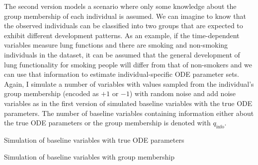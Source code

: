 The second version models a scenario where only some knowledge about the group membership of each individual is assumed. 
We can imagine to know that the observed individuals can be classified into two groups that are expected to exhibit different development patterns. As an example, if the time-dependent variables measure lung functions and there are smoking and non-smoking individuals in the dataset, it can be assumed that the general development of lung functionality for smoking people will differ from that of non-smokers and we can use that information to estimate individual-specific ODE parameter sets. 
Again, I simulate a number of variables with values sampled from the individual's group membership (encoded as $+1$ or $-1$) with random noise and add noise variables as in the first version of simulated baseline variables with the true ODE parameters. 
The number of baseline variables containing information either about the true ODE parameters or the group membership is denoted with $q_{\mathrm{info}}$. 
\begin{algorithm}
	\SetAlgoLined
	\caption{Simulation of baseline variables with true ODE parameters}
	\label{algo-simulation-baseline-trueODEparams}
\end{algorithm}

\begin{algorithm}
	\SetAlgoLined
	\caption{Simulation of baseline variables with group membership}
	\label{algo-simulation-baseline-groupinfo}
\end{algorithm}

